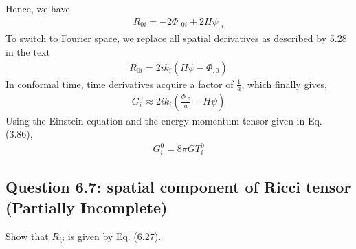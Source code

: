 \documentclass[11pt]{article}
\begin{document}
Hence, we have 
\begin{align*}
    R_{0i} = -2 \Phi_{,0i} +2H\psi_{,i} 
\end{align*}
To switch to Fourier space, we replace all spatial derivatives as described by 5.28 in the text
\begin{align*}
    R_{0i} = 2ik_i(H \psi - \Phi_{,0})
\end{align*}
In conformal time, time derivatives acquire a factor of $\frac{1}{a}$, which finally gives, 
\begin{align*}
    G^0_i \approx 2ik_i (\frac{\Phi_{,0}}{a} - H \psi)
\end{align*}
Using the Einstein equation and the energy-momentum tensor given in Eq. (3.86), 
\begin{align*}
    G^0_i = 8 \pi G T^0_i 
\end{align*}

\subsection{Question 6.7: spatial component of Ricci tensor (Partially Incomplete)}
Show that $R_{ij}$ is given by Eq. (6.27). 
\end{document}
